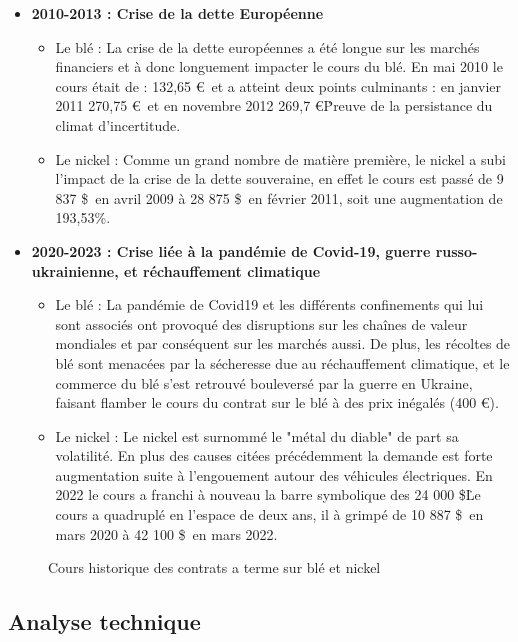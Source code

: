 \begin{itemize}
    \item \textbf{2010-2013 : Crise de la dette Européenne}
    \begin{itemize}
        \item Le blé : La crise de la dette européennes a été longue sur les marchés financiers et à donc longuement impacter le cours du blé.
        En mai 2010 le cours était de : 132,65 \euro\ et a atteint deux points culminants : en janvier 2011 270,75 \euro\ et en novembre 2012 269,7 \euro\. Preuve 
        de la persistance du climat d'incertitude.
        \item Le nickel : Comme un grand nombre de matière première, le nickel a subi l'impact de la crise de la dette souveraine, en effet le cours est passé de 9 837 \$\ en avril 2009 à 28 875 \$\ en février 2011, soit une augmentation de 193,53\%.
    \end{itemize}
    \item \textbf{2020-2023 : Crise liée à la pandémie de Covid-19, guerre russo-ukrainienne, et réchauffement climatique}
    \begin{itemize}
        \item Le blé : La pandémie de Covid19 et les différents confinements qui lui sont associés ont provoqué des disruptions sur les chaînes de valeur mondiales et par 
        conséquent sur les marchés aussi. De plus, les récoltes de blé sont menacées par la sécheresse due au réchauffement climatique, et le commerce du blé s'est 
        retrouvé bouleversé par la guerre en Ukraine, faisant flamber le cours du contrat sur le blé à des prix inégalés (400 \euro).
        \item Le nickel : Le nickel est surnommé le "métal du diable" de part sa volatilité. En plus des causes citées précédemment la demande est forte augmentation suite à l'engouement autour des véhicules électriques. En 2022 le cours a franchi à nouveau la barre symbolique des 24 000 \$\. Le cours a quadruplé en l'espace de deux ans, il à grimpé de 10 887 \$\ en mars 2020 à 42 100 \$\ en mars 2022.
    \end{itemize}
\end{itemize}
\begin{figure}[H]
    \centering
    \resizebox{\textwidth}{!}{}
    \caption{Cours historique des contrats a terme sur blé et nickel}
\end{figure}
\subsection{Analyse technique}
